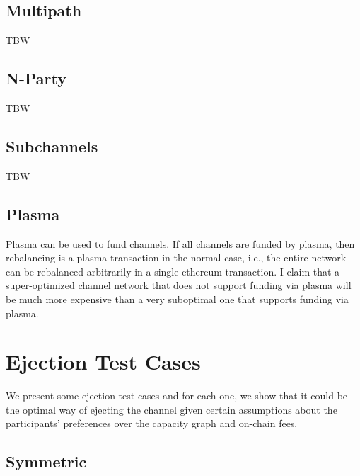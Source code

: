 \documentclass{article}
\begin{document}
\subsection*{Multipath}

TBW

\subsection*{N-Party}

TBW

\subsection*{Subchannels}

TBW

\subsection*{Plasma}

Plasma can be used to fund channels. If all channels are funded by plasma, then rebalancing is a plasma transaction in the normal case, i.e., the entire network can be rebalanced arbitrarily in a single ethereum transaction. I claim that a super-optimized channel network that does not support funding via plasma will be much more expensive than a very suboptimal one that supports funding via plasma.

\section*{Ejection Test Cases}

We present some ejection test cases and for each one, we show that it could be the optimal way of ejecting the channel given certain assumptions about the participants' preferences over the capacity graph and on-chain fees.

\subsection*{Symmetric}

\begin{figure}[H]
    \centering
\end{figure}
\end{document}
